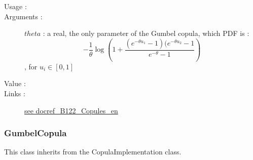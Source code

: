\begin{description}

\item[Usage :] \rule{0pt}{1em}


\item[Arguments :]  $theta$     : a real, the only parameter of the Gumbel copula, which PDF is :
  $$
  \displaystyle -\frac{1}{\theta}\log\left(1+\frac{(e^{-\theta u_1}-1)(e^{-\theta u_2}-1}{e^{-\theta}-1}\right)
  $$, for $u_i \in [0,1]$

\item[Value :]  \rule{0pt}{1em}

\item[Links :]
  \href{./Version/docref_B122_Copules_en.pdf}{see docref\_B122\_Copules\_en}
\end{description}

\newpage \subsubsection{GumbelCopula}

This class inherits from the CopulaImplementation class.


